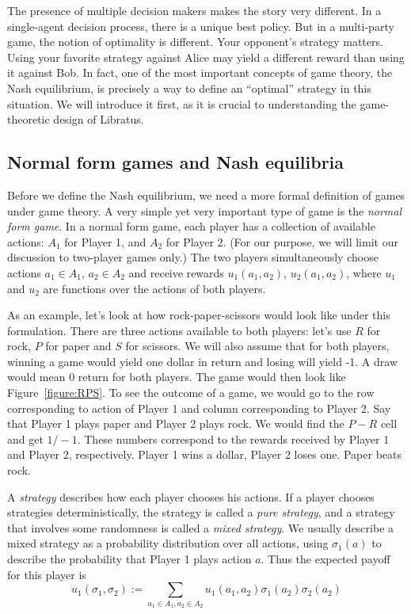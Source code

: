 \documentclass[10pt,a4paper]{article}
\begin{document}
The presence of multiple decision makers makes the story very different. In a single-agent decision process, there is a unique best policy. But in a multi-party game, the notion of optimality is different. Your opponent's strategy matters. Using your favorite strategy against Alice may yield a different reward than using it against Bob. In fact, one of the most important concepts of game theory, the Nash equilibrium, is precisely a way to define an ``optimal'' strategy in this situation. We will introduce it first, as it is crucial to understanding the game-theoretic design of Libratus.

\subsection{Normal form games and Nash equilibria}

Before we define the Nash equilibrium, we need a more formal definition of games under game theory. A very simple yet very important type of game is the \textit{normal form game}. In a normal form game, each player has a collection of available actions: $A_1$ for Player 1, and $A_2$ for Player 2. (For our purpose, we will limit our discussion to two-player games only.) The two players simultaneously choose actions $a_1 \in A_1$, $a_2 \in A_2$ and receive rewards $u_1(a_1, a_2)$, $u_2(a_1, a_2)$, where $u_1$ and $u_2$ are functions over the actions of both players.

As an example, let's look at how rock-paper-scissors would look like under this formulation. There are three actions available to both players: let's use $R$ for rock, $P$ for paper and $S$ for scissors. We will also assume that for both players, winning a game would yield one dollar in return and losing will yield -1. A draw would mean 0 return for both players. The game would then look like Figure~\ref{figure:RPS}. To see the outcome of a game, we would go to the row corresponding to action of Player 1 and column corresponding to Player 2. Say that Player 1 plays paper and Player 2 plays rock. We would find the $P-R$ cell and get $1/-1$. These numbers correspond to the rewards received by Player 1 and Player 2, respectively. Player 1 wins a dollar, Player 2 loses one. Paper beats rock.

A \textit{strategy} describes how each player chooses his actions. If a player chooses strategies deterministically, the strategy is called a \textit{pure strategy}, and a strategy that involves some randomness is called a \textit{mixed strategy}. We usually describe a mixed strategy as a probability distribution over all actions, using $\sigma_1(a)$ to describe the probability that Player 1 plays action $a$. Thus the expected payoff for this player is
$$
  u_1(\sigma_1, \sigma_2) := \sum_{a_1 \in A_1, a_2 \in A_2} u_1(a_1, a_2)\sigma_1(a_2)\sigma_2(a_2)
$$
\end{document}

